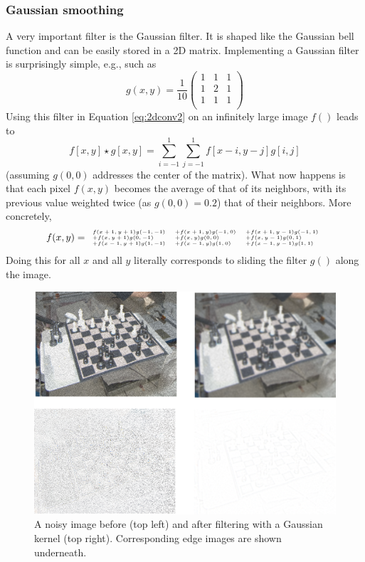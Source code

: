 \subsubsection{Gaussian smoothing}
A very important filter is the Gaussian filter. It is shaped like the Gaussian bell function and can be easily stored in a 2D matrix. Implementing a Gaussian filter is surprisingly simple, e.g., such as
\begin{equation}
g(x,y)=\frac{1}{10}
\left(
\begin{array}{ccc}
1 & 1 & 1\\
1 & 2 & 1\\
1 & 1 & 1\\
\end{array}
\right)
\end{equation}
Using this filter in Equation \ref{eq:2dconv2} on an infinitely large image $f()$ leads to
\begin{equation}\label{eq:2dconv3}
f[x,y]\star g[x,y]=\sum_{i=-1}^{1}\sum_{j=-1}^{1}f[x-i,y-j]g[i,j]
\end{equation}
(assuming $g(0,0)$ addresses the center of the matrix). What now happens is that each pixel $f(x,y)$ becomes the average of that of its neighbors, with its previous value weighted twice (as $g(0,0)=0.2$) that of their neighbors. More concretely,
\begin{equation}
\tiny
f(x,y)=
\begin{array}{lll}
f(x+1,y+1)g(-1,-1) &+f(x+1,y)g(-1,0) &+f(x+1,y-1)g(-1,1)\\
+f(x,y+1)g(0,-1) &+f(x,y)g(0,0) &+f(x,y-1)g(0,1)\\
+f(x-1,y+1)g(1,-1) &+f(x-1,y)g(1,0) &+f(x-1,y-1)g(1,1)
\end{array}
\end{equation}
Doing this for all $x$ and all $y$ literally corresponds to sliding the filter $g()$ along the image. 

\begin{figure}
	\centering
		\includegraphics[width=\textwidth]{figs/filters}
	\caption{A noisy image before (top left) and after filtering with a Gaussian kernel (top right). Corresponding edge images are shown underneath. 
	\label{fig:filters}}
\end{figure}

